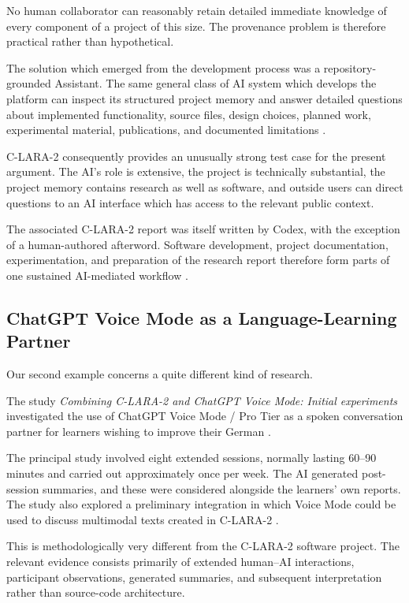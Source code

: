 No human collaborator can reasonably retain detailed immediate knowledge of every component of a project of this size. The provenance problem is therefore practical rather than hypothetical.

The solution which emerged from the development process was a repository-grounded Assistant. The same general class of AI system which develops the platform can inspect its structured project memory and answer detailed questions about implemented functionality, source files, design choices, planned work, experimental material, publications, and documented limitations \citep{bediEtAl2026clara2}.

C-LARA-2 consequently provides an unusually strong test case for the present argument. The AI's role is extensive, the project is technically substantial, the project memory contains research as well as software, and outside users can direct questions to an AI interface which has access to the relevant public context.

The associated C-LARA-2 report was itself written by Codex, with the exception of a human-authored afterword. Software development, project documentation, experimentation, and preparation of the research report therefore form parts of one sustained AI-mediated workflow \citep{bediEtAl2026clara2}.


\subsection{ChatGPT Voice Mode as a Language-Learning Partner}

Our second example concerns a quite different kind of research.

The study \emph{Combining C-LARA-2 and ChatGPT Voice Mode: Initial experiments} investigated the use of ChatGPT Voice Mode / Pro Tier as a spoken conversation partner for learners wishing to improve their German \citep{wrightEtAl2026voice}.

The principal study involved eight extended sessions, normally lasting 60--90 minutes and carried out approximately once per week. The AI generated post-session summaries, and these were considered alongside the learners' own reports. The study also explored a preliminary integration in which Voice Mode could be used to discuss multimodal texts created in C-LARA-2 \citep{wrightEtAl2026voice}.

This is methodologically very different from the C-LARA-2 software project. The relevant evidence consists primarily of extended human--AI interactions, participant observations, generated summaries, and subsequent interpretation rather than source-code architecture.

